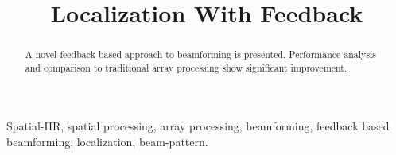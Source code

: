 \documentclass[conference]{IEEEtran}
\begin{document}
\title{Localization With Feedback}

\author{
\and
{}
\and
{}
}
\maketitle

\begin{abstract}
A novel feedback based approach to beamforming is presented.  Performance analysis and comparison to traditional array processing show significant improvement. 
\end{abstract}

\begin{IEEEkeywords}
Spatial-IIR, spatial processing, array processing, beamforming, feedback based beamforming, localization, beam-pattern.
\end{IEEEkeywords}
\end{document}
